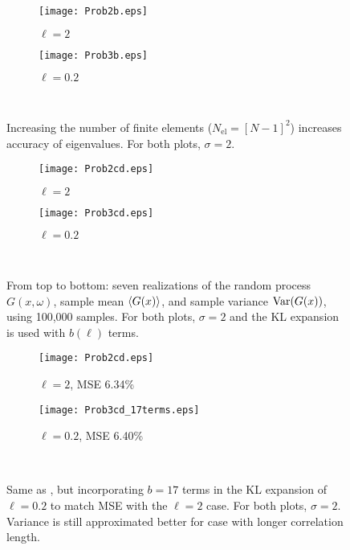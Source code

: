 \documentclass[11pt]{article}
\begin{document}
\begin{figure}[p]
\centering
\begin{subfigure}{0.49\textwidth}
\texttt{[image: Prob2b.eps]}
\caption{$\ell=2$}
\end{subfigure}
\begin{subfigure}{0.49\textwidth}
\texttt{[image: Prob3b.eps]}
\caption{$\ell=0.2$}
\end{subfigure}
\\[0.2cm]
\caption{Increasing the number of finite elements ($N_\text{el}=[N-1]^2$) increases accuracy of eigenvalues. For both plots, $\sigma=2$.}
\label{fig:error_reduction}
\end{figure}

\begin{figure}[p]
\centering
\begin{subfigure}{0.49\textwidth}
\texttt{[image: Prob2cd.eps]}
\caption{$\ell=2$}
\end{subfigure}
\begin{subfigure}{0.49\textwidth}
\texttt{[image: Prob3cd.eps]}
\caption{$\ell=0.2$}
\end{subfigure}
\\[0.2cm]
\caption{From top to bottom: seven realizations of the random process $G(x,\omega)$, sample mean $\left\langle G(x) \right\rangle$, and sample variance $\operatorname{Var}(G(x))$, using 100,000 samples. For both plots, $\sigma=2$ and the KL expansion is used with $b(\ell)$ terms.}
\label{fig:realizations}
\end{figure}

\begin{figure}[p]
\centering
\begin{subfigure}{0.49\textwidth}
\texttt{[image: Prob2cd.eps]}
\caption{$\ell=2$, MSE 6.34\%}
\end{subfigure}
\begin{subfigure}{0.49\textwidth}
\texttt{[image: Prob3cd\_17terms.eps]}
\caption{$\ell=0.2$, MSE 6.40\%}
\end{subfigure}
\\[0.2cm]
\caption{Same as , but incorporating $b=17$ terms in the KL expansion of $\ell=0.2$ to match MSE with the $\ell=2$ case. For both plots, $\sigma=2$. Variance is still approximated better for case with longer correlation length.}
\label{fig:realizations_moreterms}
\end{figure}

\end{document}
